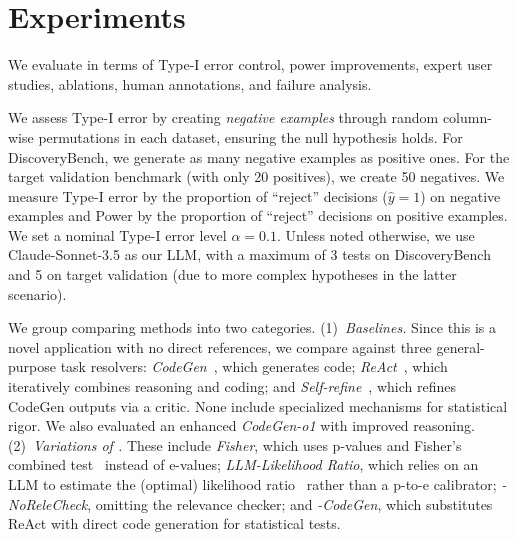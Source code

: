 

\section{Experiments}
We evaluate \mname in terms of Type-I error control, power improvements, expert user studies, ablations, human annotations, and failure analysis.

\vspace{-0.5em}


We assess Type-I error by creating \emph{negative examples} through random column-wise permutations in each dataset, ensuring the null hypothesis holds. 
For DiscoveryBench, we generate as many negative examples as positive ones. 
For the target validation benchmark (with only 20 positives), we create 50 negatives. 
We measure Type-I error by the proportion of ``reject'' decisions ($\hat{y}=1$) on negative examples and Power by the proportion of ``reject'' decisions on positive examples. 
We set a nominal Type-I error level $\alpha=0.1$. 
Unless noted otherwise, we use Claude-Sonnet-3.5 as our LLM, with a maximum of 3 tests on DiscoveryBench and 5 on target validation (due to more complex hypotheses in the latter scenario).





\vspace{-0.5em}
We group comparing methods into two categories. 
(1)~\textit{Baselines.} Since this is a novel application with no direct references, we compare against three general-purpose task resolvers: \textit{CodeGen}~\cite{ridnik2024code}, which generates code; \textit{ReAct}~\cite{yao2023react}, which iteratively combines reasoning and coding; and \textit{Self-refine}~\cite{madaan2024self}, which refines CodeGen outputs via a critic. None include specialized mechanisms for statistical rigor. 
We also evaluated an enhanced \textit{CodeGen-o1} with improved reasoning. (2)~\textit{Variations of \mname.} These include \textit{Fisher}, which uses p-values and Fisher's combined test~\cite{fisher1970statistical} instead of e-values; \textit{LLM-Likelihood Ratio}, which relies on an LLM to estimate the (optimal) likelihood ratio~\cite{zheng2023judging} rather than a p-to-e calibrator; \textit{\mname-NoReleCheck}, omitting the relevance checker; and \textit{\mname-CodeGen}, which substitutes ReAct with direct code generation for statistical tests.




